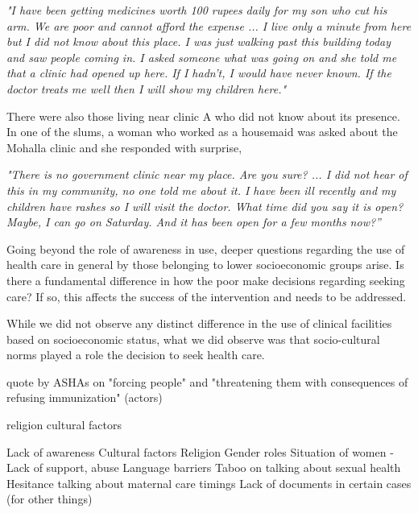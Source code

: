 \textit{"I have been getting medicines worth 100 rupees daily for my son who cut his arm. We are poor and cannot afford the expense ... I live only a minute from here but I did not know about this place. I was just walking past this building today and saw people coming in. I asked someone what was going on and she told me that a clinic had opened up here. If I hadn't, I would have never known. If the doctor treats me well then I will show my children here."}

There were also those living near clinic A who did not know about its presence. In one of the slums, a woman who worked as a housemaid was asked about the Mohalla clinic and she responded with surprise,

\textit{"There is no government clinic near my place. Are you sure? ... I did not hear of this in my community, no one told me about it. I have been ill recently and my children have rashes so I will visit the doctor. What time did you say it is open? Maybe, I can go on Saturday. And it has been open for a few months now?”}

Going beyond the role of awareness in use, deeper questions regarding the use of health care in general by those belonging to lower socioeconomic groups arise. Is there a fundamental difference in how the poor make decisions regarding seeking care? If so, this affects the success of the intervention and needs to be addressed. 

While we did not observe any distinct difference in the use of clinical facilities based on socioeconomic status, what we did observe was that socio-cultural norms played a role the decision to seek health care. 



quote by ASHAs on "forcing people" and "threatening them with consequences of refusing immunization" (actors)



religion
cultural factors



Lack of awareness
Cultural factors
Religion
Gender roles
Situation of women - Lack of support, abuse
Language barriers
Taboo on talking about sexual health
Hesitance talking about maternal care
timings
Lack of documents in certain cases (for other things)



